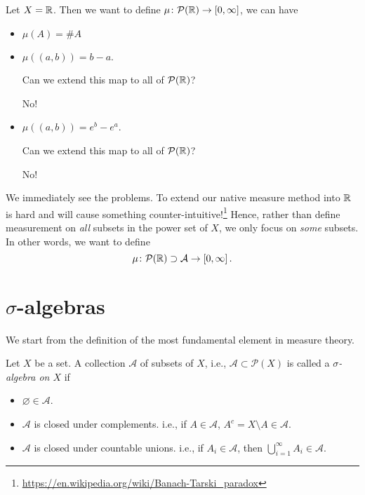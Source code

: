\begin{eg}
	Let \(X = \mathbb{\MakeUppercase{R}} \). Then we want to define \(\mu\colon \mathcal{P}(\mathbb{\MakeUppercase{R}} )\to \left[0, \infty\right] \), we can have
	\begin{itemize}
		\item \(\mu(A) = \# A\)
		\item \(\mu(\left(a, b\right)) = b-a\).
		      \begin{problem}
		      Can we extend this map to all of \(\mathcal{P}(\mathbb{\MakeUppercase{R}} )\)?
		      \end{problem}
		      \begin{answer}
			      No!
		      \end{answer}
		\item \(\mu(\left(a, b\right)) = e^b - e^a\).
		      \begin{problem}
		      Can we extend this map to all of \(\mathcal{P}(\mathbb{\MakeUppercase{R}} )\)?
		      \end{problem}
		      \begin{answer}
			      No!
		      \end{answer}
	\end{itemize}
\end{eg}

We immediately see the problems. To extend our native measure method into \(\mathbb{\MakeUppercase{R}} \) is hard and will cause something counter-intuitive!\footnote{\url{https://en.wikipedia.org/wiki/Banach-Tarski_paradox}}
Hence, rather than define measurement on \emph{all} subsets in the power set of \(X\), we only focus on \emph{some} subsets. In other words, we
want to define
\[
	\mu\colon \mathcal{P}(\mathbb{\MakeUppercase{R}} )\supset\mathcal{A} \to \left[0, \infty\right].
\]

\section{\(\sigma\)-algebras}
We start from the definition of the most fundamental element in measure theory.
\begin{definition}\label{def:sigma-algebra}
	Let \(X\) be a set. A collection \(\mathcal{A} \) of subsets of \(X\), i.e., \(\mathcal{A}\subset \mathcal{P} (X) \) is called a \emph{\(\sigma\)-algebra on \(X\)} if
	\begin{itemize}
		\item \(\varnothing \in \mathcal{A} \).
		\item \(\mathcal{A} \) is closed under complements. i.e., if \(A\in \mathcal{A} \), \(A^c = X\setminus A\in \mathcal{A} \).
		\item \(\mathcal{A} \) is closed under countable unions. i.e., if \(A_i\in \mathcal{A} \), then \(\bigcup\limits_{i=1}^{\infty} A_{i}\in \mathcal{A} \).
	\end{itemize}
\end{definition}

